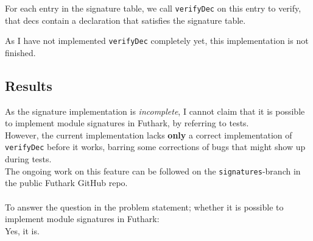 For each entry in the signature table, we call \texttt{verifyDec} on this entry to
verify, that decs contain a declaration that satisfies the signature table.

As I have not implemented \texttt{verifyDec} completely yet, this implementation
is not finished.

\subsection{Results}
As the signature implementation is \textit{incomplete}, I cannot claim that it
is possible to implement module signatures in Futhark, by referring to tests.
\\
However, the current implementation lacks \textbf{only} a correct implementation of
\texttt{verifyDec} before it works, barring some corrections of bugs that might
show up during tests.
\\
The ongoing work on this feature can be followed on the \texttt{signatures}-branch in
the public Futhark GitHub repo.
\\
\\
To answer the question in the problem statement; whether it is possible to implement module signatures in
Futhark: \\
Yes, it is. 